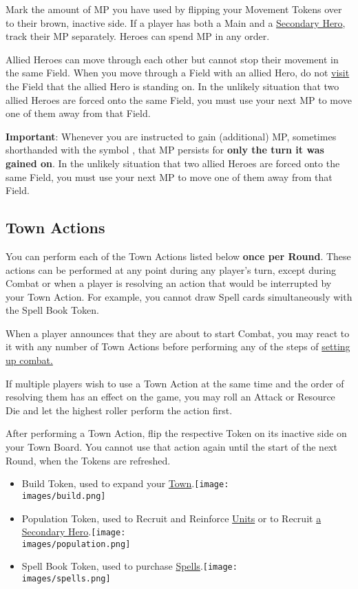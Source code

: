 \begin{multicols*}{2}
\bigskip

Mark the amount of MP you have used by flipping your Movement Tokens over to their brown, inactive side.
If a player has both a Main and a \hyperlink{Secondary}{Secondary Hero}, track their MP separately.
Heroes can spend MP in any order.\par
Allied Heroes can move through each other but cannot stop their movement in the same Field.
When you move through a Field with an allied Hero, do not \hyperlink{Categories}{visit} the Field that the allied Hero is standing on.
In the unlikely situation that two allied Heroes are forced onto the same Field, you must use your next MP to move one of them away from that Field.\par
\textbf{Important}: Whenever you are instructed to gain (additional) MP, sometimes shorthanded with the symbol , that MP persists for \textbf{only the turn it was gained on}.
In the unlikely situation that two allied Heroes are forced onto the same Field, you must use your next MP to move one of them away from that Field.

\subsection*{Town Actions}
You can perform each of the Town Actions listed below \textbf{once per Round}.
These actions can be performed at any point during any player's turn, except during Combat or when a player is resolving an action that would be interrupted by your Town Action.
For example, you cannot draw Spell cards simultaneously with the Spell Book Token.\par
When a player announces that they are about to start Combat, you may react to it with any number of Town Actions before performing any of the steps of \hyperlink{Combatsetup}{setting up combat.}\par
If multiple players wish to use a Town Action at the same time and the order of resolving them has an effect on the game, you may roll an Attack or Resource Die and let the highest roller perform the action first.\par
After performing a Town Action, flip the respective Token on its inactive side on your Town Board.
You cannot use that action again until the start of the next Round, when the Tokens are refreshed.
\begin{itemize}
  \item Build Token, used to expand your \hyperlink{Town}{Town}.\texttt{[image: \\images/build.png]}
  \item Population Token, used to Recruit and Reinforce \hyperlink{Units}{Units} or to Recruit \hyperlink{Secondary}{a Secondary Hero}.\texttt{[image: \\images/population.png]}
  \item Spell Book Token, used to purchase \hyperlink{spells}{Spells}.\texttt{[image: \\images/spells.png]}
\end{itemize}


\end{multicols*}
